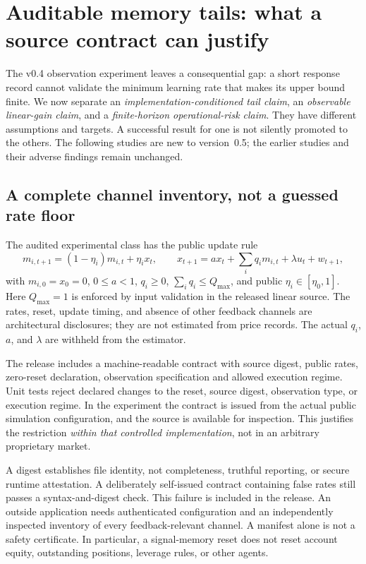 \documentclass[11pt,a4paper]{article}
\theoremstyle{definition}
\theoremstyle{remark}
\begin{document}
\section{Auditable memory tails: what a source contract can justify}
\label{sec:audited_tails}
The v0.4 observation experiment leaves a consequential gap: a short response record cannot validate the minimum learning rate that makes its upper bound finite. We now separate an \emph{implementation-conditioned tail claim}, an \emph{observable linear-gain claim}, and a \emph{finite-horizon operational-risk claim}. They have different assumptions and targets. A successful result for one is not silently promoted to the others. The following studies are new to version~0.5; the earlier studies and their adverse findings remain unchanged.

\subsection{A complete channel inventory, not a guessed rate floor}
The audited experimental class has the public update rule
\begin{equation}
 m_{i,t+1}=(1-\eta_i)m_{i,t}+\eta_i x_t,\qquad
 x_{t+1}=a x_t+\sum_i q_i m_{i,t}+\lambda u_t+w_{t+1},
 \label{eq:audited_recursion}
\end{equation}
with $m_{i,0}=x_0=0$, $0\le a<1$, $q_i\ge0$, $\sum_iq_i\le Q_{\max}$, and public $\eta_i\in[\eta_0,1]$. Here $Q_{\max}=1$ is enforced by input validation in the released linear source. The rates, reset, update timing, and absence of other feedback channels are architectural disclosures; they are not estimated from price records. The actual $q_i$, $a$, and $\lambda$ are withheld from the estimator.

The release includes a machine-readable contract with source digest, public rates, zero-reset declaration, observation specification and allowed execution regime. Unit tests reject declared changes to the reset, source digest, observation type, or execution regime. In the experiment the contract is issued from the actual public simulation configuration, and the source is available for inspection. This justifies the restriction \emph{within that controlled implementation}, not in an arbitrary proprietary market.

A digest establishes file identity, not completeness, truthful reporting, or secure runtime attestation. A deliberately self-issued contract containing false rates still passes a syntax-and-digest check. This failure is included in the release. An outside application needs authenticated configuration and an independently inspected inventory of every feedback-relevant channel. A manifest alone is not a safety certificate. In particular, a signal-memory reset does not reset account equity, outstanding positions, leverage rules, or other agents.
\end{document}
